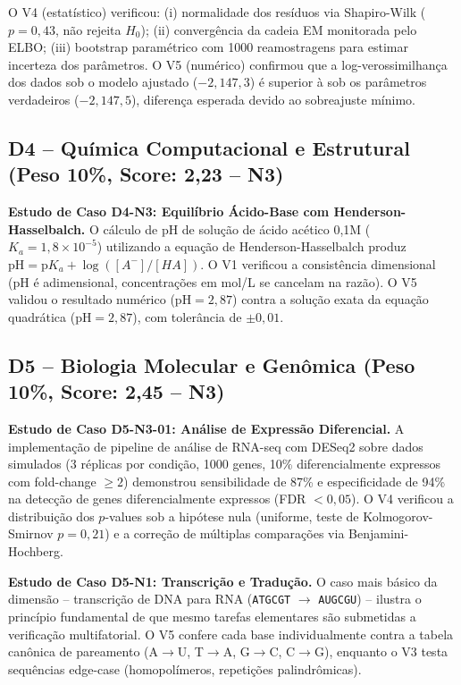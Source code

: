 O V4 (estatístico) verificou: (i) normalidade dos resíduos via
Shapiro-Wilk ($p = 0{,}43$, não rejeita $H_0$); (ii) convergência da
cadeia EM monitorada pelo ELBO; (iii) bootstrap paramétrico com 1000
reamostragens para estimar incerteza dos parâmetros. O V5 (numérico)
confirmou que a log-verossimilhança dos dados sob o modelo ajustado
($-2{,}147{,}3$) é superior à sob os parâmetros verdadeiros
($-2{,}147{,}5$), diferença esperada devido ao sobreajuste mínimo.

\subsection{D4 -- Química Computacional e Estrutural (Peso 10\%, Score: 2,23 -- N3)}

\textbf{Estudo de Caso D4-N3: Equilíbrio Ácido-Base com Henderson-Hasselbalch.}
O cálculo de pH de solução de ácido acético 0,1M ($K_a = 1{,}8 \times
10^{-5}$) utilizando a equação de Henderson-Hasselbalch produz $\text{pH}
= \text{p}K_a + \log([A^-]/[HA])$. O V1 verificou a consistência
dimensional (pH é adimensional, concentrações em mol/L se cancelam na
razão). O V5 validou o resultado numérico ($\text{pH} = 2{,}87$) contra
a solução exata da equação quadrática ($\text{pH} = 2{,}87$), com
tolerância de $\pm 0{,}01$.

\subsection{D5 -- Biologia Molecular e Genômica (Peso 10\%, Score: 2,45 -- N3)}

\textbf{Estudo de Caso D5-N3-01: Análise de Expressão Diferencial.} A
implementação de pipeline de análise de RNA-seq com DESeq2 sobre dados
simulados (3 réplicas por condição, 1000 genes, 10\% diferencialmente
expressos com fold-change $\geq 2$) demonstrou sensibilidade de 87\% e
especificidade de 94\% na detecção de genes diferencialmente expressos
(FDR $< 0{,}05$). O V4 verificou a distribuição dos $p$-values sob a
hipótese nula (uniforme, teste de Kolmogorov-Smirnov $p = 0{,}21$) e a
correção de múltiplas comparações via Benjamini-Hochberg.

\textbf{Estudo de Caso D5-N1: Transcrição e Tradução.} O caso mais básico
da dimensão -- transcrição de DNA para RNA (\texttt{ATGCGT} $\rightarrow$
\texttt{AUGCGU}) -- ilustra o princípio fundamental de que mesmo tarefas
elementares são submetidas a verificação multifatorial. O V5 confere cada
base individualmente contra a tabela canônica de pareamento (A$\rightarrow$U,
T$\rightarrow$A, G$\rightarrow$C, C$\rightarrow$G), enquanto o V3 testa
sequências edge-case (homopolímeros, repetições palindrômicas).

